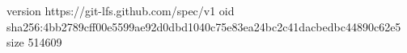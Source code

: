 version https://git-lfs.github.com/spec/v1
oid sha256:4bb2789cff00e5599ae92d0dbd1040c75e83ea24bc2c41dacbedbc44890c62e5
size 514609
